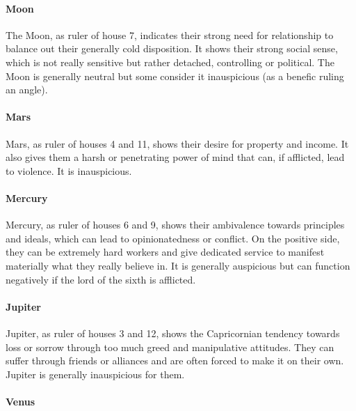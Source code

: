  

\paragraph{Moon}

The Moon, as ruler of house 7, indicates their strong need for relationship to balance out their generally cold disposi­tion. It shows their strong social sense, which is not really sensitive but rather detached, controlling or political. The Moon is generally neutral but some consider it inauspicious (as a benefic ruling an angle).

 

\paragraph{Mars}

Mars, as ruler of houses 4 and 11, shows their desire for property and income. It also gives them a harsh or penetrating power of mind that can, if afflicted, lead to violence. It is inauspicious.

 

\paragraph{Mercury}

Mercury, as ruler of houses 6 and 9, shows their ambiva­lence towards principles and ideals, which can lead to opiniona­ted­ness or conflict. On the positive side, they can be extremely hard workers and give dedicated service to manifest materially what they really believe in. It is generally auspicious but can function negatively if the lord of the sixth is afflicted.

 

\paragraph{Jupiter}

Jupiter, as ruler of houses 3 and 12, shows the Capricor­nian tendency towards loss or sorrow through too much greed and manipulative attitudes. They can suffer through friends or alliances and are often forced to make it on their own. Jupiter is generally inauspicious for them.

 

\paragraph{Venus}

